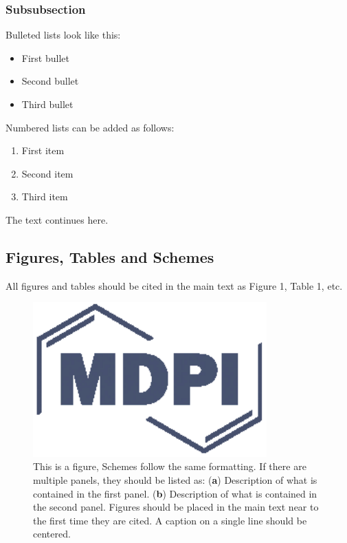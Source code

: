 \documentclass[entropy,article,submit,moreauthors,pdftex,10pt,a4paper]{mdpi}
\begin{document}
\subsubsection{Subsubsection}

Bulleted lists look like this:
\begin{itemize}[leftmargin=*,labelsep=4mm]
\item	First bullet
\item	Second bullet
\item	Third bullet
\end{itemize}

Numbered lists can be added as follows:
\begin{enumerate}[leftmargin=*,labelsep=3mm]
\item	First item
\item	Second item
\item	Third item
\end{enumerate}

The text continues here.

\subsection{Figures, Tables and Schemes}

All figures and tables should be cited in the main text as Figure 1, Table 1, etc.

\begin{figure}[H]
\centering
\includegraphics[width=9cm]{subjectaveraged.eps}
\caption{This is a figure, Schemes follow the same formatting. If there are multiple panels, they should be listed as: (\textbf{a}) Description of what is contained in the first panel. (\textbf{b}) Description of what is contained in the second panel. Figures should be placed in the main text near to the first time they are cited. A caption on a single line should be centered.}
\end{figure}   
\end{document}
